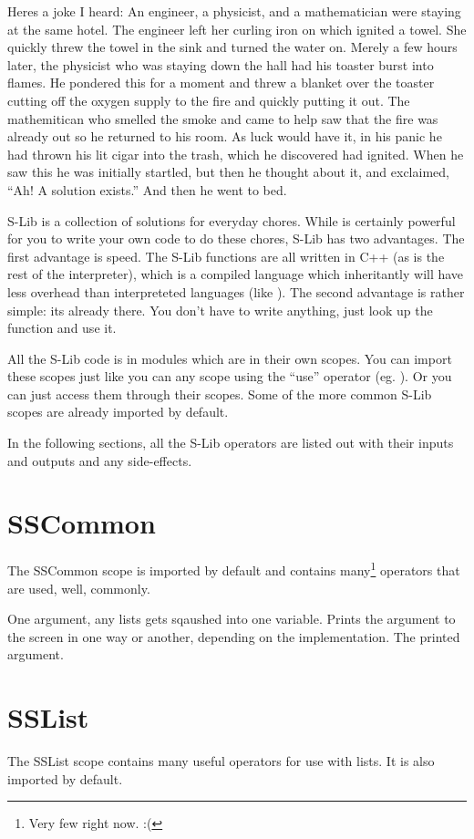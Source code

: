 \documentclass{book}
\begin{document}
Heres a joke I heard:  An engineer, a physicist, and a mathematician were staying at the same hotel.  The engineer left her curling iron on which ignited a towel.  She quickly threw the towel in the sink and turned the water on.  Merely a few hours later, the physicist who was staying down the hall had his toaster burst into flames.  He pondered this for a moment and threw a blanket over the toaster cutting off the oxygen supply to the fire and quickly putting it out.  The mathemitican who smelled the smoke and came to help saw that the fire was already out so he returned to his room.  As luck would have it, in his panic he had thrown his lit cigar into the trash, which he discovered had ignited.  When he saw this he was initially startled, but then he thought about it, and exclaimed, ``Ah!  A solution exists.''  And then he went to bed.

S-Lib is a collection of solutions for everyday chores.  While \SSquared is certainly powerful for you to write your own code to do these chores, S-Lib has two advantages.  The first advantage is speed.  The S-Lib functions are all written in C++ (as is the rest of the interpreter), which is a compiled language which inheritantly will have less overhead than interpreteted languages (like \SSquared).  The second advantage is rather simple: its already there.  You don't have to write anything, just look up the function and use it.

All the S-Lib code is in modules which are in their own scopes.  You can import these scopes just like you can any scope using the ``use'' operator (eg. ).  Or you can just access them through their scopes.  Some of the more common S-Lib scopes are already imported by default.

In the following sections, all the S-Lib operators are listed out with their inputs and outputs and any side-effects.

\section{SSCommon}
The SSCommon scope is imported by default and contains many\footnote{Very few right now. :(} operators that are used, well, commonly.

{One argument, any lists gets sqaushed into one variable.}
{Prints the argument to the screen in one way or another, depending on the implementation.}
{The printed argument.}

\section{SSList}
The SSList scope contains many useful operators for use with lists.  It is also imported by default.
\end{document}
